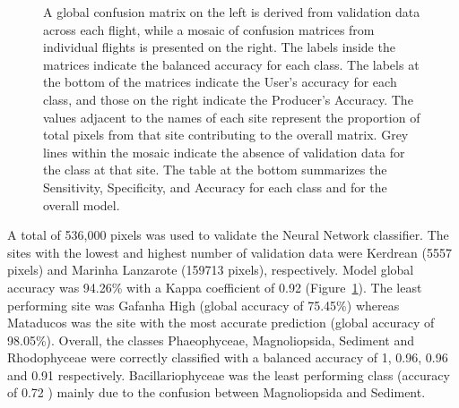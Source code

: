 \documentclass[
  number]{elsarticle}
\begin{document}
\label{cell-fig-Validation}
\begin{figure}[H]


\caption{\label{fig-Validation}A global confusion matrix on the left is
derived from validation data across each flight, while a mosaic of
confusion matrices from individual flights is presented on the right.
The labels inside the matrices indicate the balanced accuracy for each
class. The labels at the bottom of the matrices indicate the User's
accuracy for each class, and those on the right indicate the Producer's
Accuracy. The values adjacent to the names of each site represent the
proportion of total pixels from that site contributing to the overall
matrix. Grey lines within the mosaic indicate the absence of validation
data for the class at that site. The table at the bottom summarizes the
Sensitivity, Specificity, and Accuracy for each class and for the
overall model.}

\end{figure}%

A total of 536,000 pixels was used to validate the Neural Network
classifier. The sites with the lowest and highest number of validation
data were Kerdrean (5557 pixels) and Marinha Lanzarote (159713 pixels),
respectively. Model global accuracy was 94.26\% with a Kappa coefficient
of 0.92 (Figure~\ref{fig-Validation}). The least performing site was
Gafanha High (global accuracy of 75.45\%) whereas Mataducos was the site
with the most accurate prediction (global accuracy of 98.05\%). Overall,
the classes Phaeophyceae, Magnoliopsida, Sediment and Rhodophyceae were
correctly classified with a balanced accuracy of 1, 0.96, 0.96 and 0.91
respectively. Bacillariophyceae was the least performing class (accuracy
of 0.72 ) mainly due to the confusion between Magnoliopsida and
Sediment.
\end{document}
